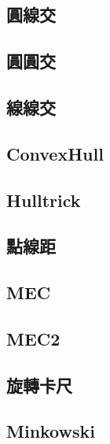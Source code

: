 \documentclass[a4paper,10pt,twocolumn,oneside]{article}
\begin{document}
    \subsection{圓線交}
    

    \subsection{圓圓交}
    

    \subsection{線線交}
    

    \subsection{ConvexHull}
    

    \subsection{Hulltrick}
    

    \subsection{點線距}
    

    \subsection{MEC}
    

    \subsection{MEC2}
    

    \subsection{旋轉卡尺}
    
    
    \subsection{Minkowski}
    
\end{document}

